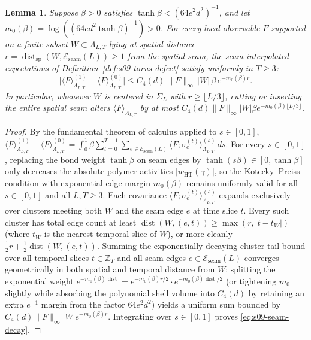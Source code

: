 \documentclass[11pt]{article}
\newtheorem{lemma}[theorem]{Lemma}
\theoremstyle{definition}
\begin{document}
\begin{lemma}
\label{lem:s09-seam-bound}
Suppose $\beta > 0$ satisfies $\tanh \beta < (64 e^2 d^2)^{-1}$, and let $m_0(\beta)
= \log((64 e d^2 \tanh \beta)^{-1}) > 0$. For every local observable $F$ supported
on a finite subset $W \subset \Lambda_{L,T}$ lying at spatial distance $r =
\operatorname{dist}_{\mathrm{sp}}(W, \mathcal{E}_{\mathrm{seam}}(L)) \ge 1$ from the
spatial seam, the seam-interpolated expectations of
Definition~\ref{def:s09-torus-defect} satisfy uniformly in $T \ge 3$:
\begin{equation}
\label{eq:s09-seam-decay}
  \bigl|\langle F \rangle_{\Lambda_{L,T}}^{(1)} - \langle F \rangle_{\Lambda_{L,T}}^{(0)}\bigr| \le C_4(d) \, \|F\|_\infty \, |W| \, \beta \, e^{-m_0(\beta) r}.
\end{equation}
In particular, whenever $W$ is centered in $\Sigma_L$ with $r \ge \lfloor L/3
\rfloor$, cutting or inserting the entire spatial seam alters $\langle F
\rangle_{\Lambda_{L,T}}$ by at most $C_4(d) \|F\|_\infty |W| \beta e^{-m_0(\beta)
\lfloor L/3 \rfloor}$.
\end{lemma}
\begin{proof}
By the fundamental theorem of calculus applied to $s \in [0, 1]$, $\langle F
\rangle_{\Lambda_{L,T}}^{(1)} - \langle F \rangle_{\Lambda_{L,T}}^{(0)} = \int_0^1
\beta \sum_{t=0}^{T-1} \sum_{e \in \mathcal{E}_{\mathrm{seam}}(L)} \langle F ;
\sigma_e^{(t)} \rangle_{\Lambda_{L,T}}^{(s)} \, ds$. For every $s \in [0, 1]$,
replacing the bond weight $\tanh \beta$ on seam edges by $\tanh(s \beta) \in [0,
\tanh \beta]$ only decreases the absolute polymer activities
$|w_{\mathrm{HT}}(\gamma)|$, so the Kotecky--Preiss condition with exponential edge
margin $m_0(\beta)$ remains uniformly valid for all $s \in [0, 1]$ and all $L, T \ge
3$. Each covariance $\langle F ; \sigma_e^{(t)} \rangle_{\Lambda_{L,T}}^{(s)}$
expands exclusively over clusters meeting both $W$ and the seam edge $e$ at time
slice $t$. Every such cluster has total edge count at least $\operatorname{dist}(W,
(e, t)) \ge \max(r, |t - t_W|)$ (where $t_W$ is the nearest temporal slice of $W$),
or more cleanly $\frac{1}{2} r + \frac{1}{2} \operatorname{dist}(W, (e, t))$.
Summing the exponentially decaying cluster tail bound over all temporal slices $t
\in \mathbb{Z}_T$ and all seam edges $e \in \mathcal{E}_{\mathrm{seam}}(L)$
converges geometrically in both spatial and temporal distance from $W$: splitting
the exponential weight $e^{-m_0(\beta) \operatorname{dist}} = e^{-m_0(\beta) r / 2}
\cdot e^{-m_0(\beta) \operatorname{dist}/2}$ (or tightening $m_0$ slightly while
absorbing the polynomial shell volume into $C_4(d)$ by retaining an extra $e^{-1}$
margin from the factor $64 e^2 d^2$) yields a uniform sum bounded by $C_4(d)
\|F\|_\infty |W| e^{-m_0(\beta) r}$. Integrating over $s \in [0, 1]$ proves
\eqref{eq:s09-seam-decay}.
\end{proof}
\end{document}
